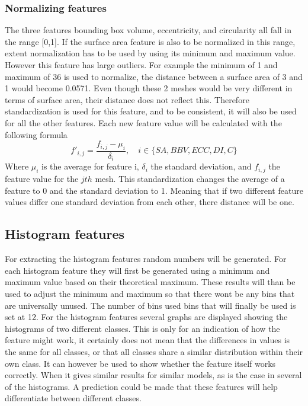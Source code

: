 \documentclass{bigdata}
\begin{document}
\subsubsection{Normalizing  features}
The three features bounding box volume, eccentricity, and circularity all fall in the range [0,1]. If the surface area feature is also to be normalized in this range, extent normalization has to be used by using its minimum and maximum value. However this feature has large outliers. For example the minimum of 1 and maximum of 36 is used to normalize, the distance between a surface area of 3 and 1 would become 0.0571. Even though these 2 meshes would be very different in terms of surface area, their distance does not reflect this. Therefore standardization is used for this feature, and to be consistent, it will also be used for all the other  features. 
Each new feature value will be calculated with the following formula
\begin{equation}
f'_{i,j} = \frac{f_{i,j} - \mu_i}{\delta_i},\quad i \in \{SA,BBV,ECC,DI,C\}
\end{equation}
Where $\mu_i$ is the average for feature i, $\delta_i$ the standard deviation, and $f_{i,j}$ the feature value for the $jth$ mesh. This standardization changes  the average of a feature to 0 and the standard deviation to 1. Meaning that if two different feature values differ one standard deviation from each other, there distance will be one. 

\subsection{Histogram features}
For extracting the histogram features random numbers will be generated. 
For each histogram feature they will first be generated using a minimum and maximum value based on their theoretical maximum. These results will than be used to adjust the minimum and maximum so that there wont be any bins that are universally unused. The number of bins used bins that will finally be used is set at 12.
For the histogram features several graphs are displayed showing the histograms of two different classes. This is only for an indication of how the feature might work, it certainly does not mean that the differences in values is the same for all classes, or that all classes share a similar distribution within their own class. It can however be used to show whether the feature itself works correctly. When it gives similar results for similar models, as is the case in several of the histograms. A prediction could be made that these features will help differentiate between different classes. 
\end{document}

